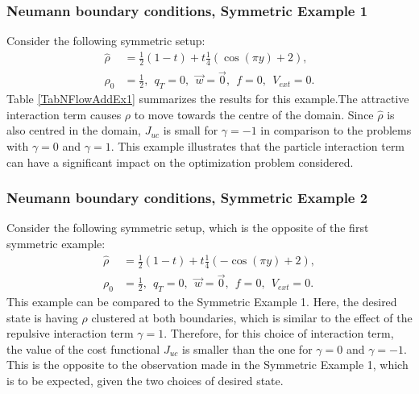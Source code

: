 
\subsubsection{Neumann boundary conditions, Symmetric Example 1}
Consider the following symmetric setup:
\begin{align*}
\widehat \rho &= \frac{1}{2}(1-t) + t\frac{1}{4}(\cos(\pi y)+2),\\
\rho_{0} &= \frac{1}{2},\  \ q_{T} = 0, \ \ \vec{w} = \vec{0}, \ \  f =0, \ \ V_{ext} =0.
\end{align*}
Table \ref{TabNFlowAddEx1} summarizes the results for this example.The attractive interaction term causes $\rho$ to move towards the centre of the domain. Since $\widehat \rho$ is also centred in the domain, $J_{uc}$ is small for $\gamma =-1$ in comparison to the problems with $\gamma =0$ and $\gamma =1$. This example illustrates that the particle interaction term can have a significant impact on the optimization problem considered. 




\subsubsection{Neumann boundary conditions, Symmetric Example 2}
Consider the following symmetric setup, which is the opposite of the first symmetric example:
\begin{align*}
\widehat \rho &= \frac{1}{2}(1-t) + t\frac{1}{4}(-\cos(\pi y)+2),\\
\rho_{0} &= \frac{1}{2},\ \
q_{T} = 0,\ \
\vec{w} = \vec{0},\ \
f =0,\ \
V_{ext} =0.
\end{align*}
This example can be compared to the Symmetric Example 1. Here, the desired state is having $\rho$ clustered at both boundaries, which is similar to the effect of the repulsive interaction term $\gamma = 1$. Therefore, for this choice of interaction term, the value of the cost functional $J_{uc}$ is smaller than the one for $\gamma = 0$ and $\gamma = -1$. This is the opposite to the observation made in the Symmetric Example 1, which is to be expected, given the two choices of desired state.


